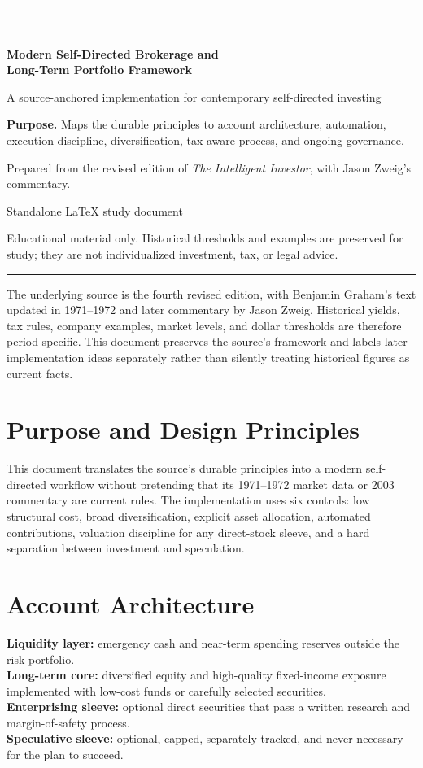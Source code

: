 \documentclass[11pt]{article}
\newcommand{\makedoccover}[4]{%
\hypersetup{pageanchor=false}%
\begin{titlepage}
\thispagestyle{empty}
\vspace*{1.0in}
{\color{Navy}\rule{\linewidth}{2.2pt}}\\[0.55in]
{\Huge\bfseries\color{Navy} #1\par}
\vspace{0.18in}
{\Large\color{Teal} #2\par}
\vspace{0.5in}
\begin{tcolorbox}[colback=LightGray,colframe=Gray,boxrule=0.5pt,arc=2mm]
\textbf{Purpose.} #3
\end{tcolorbox}
\vfill
{\large Prepared from the revised edition of \textit{The Intelligent Investor}, with Jason Zweig's commentary.\par}
\vspace{0.12in}
{\small #4\par}
\vspace{0.25in}
{\small\color{Gray}\parbox{0.90\textwidth}{\centering Educational material only. Historical thresholds and examples are preserved for study; they are not individualized investment, tax, or legal advice.}}\par
\vspace{0.35in}
{\color{Navy}\rule{\linewidth}{2.2pt}}
\end{titlepage}\hypersetup{pageanchor=true}
}
\begin{document}
\makedoccover{Modern Self-Directed Brokerage and\\Long-Term Portfolio Framework}{A source-anchored implementation for contemporary self-directed investing}{Maps the durable principles to account architecture, automation, execution discipline, diversification, tax-aware process, and ongoing governance.}{Standalone LaTeX study document}
\tableofcontents\newpage

\begin{cautionbox}
The underlying source is the fourth revised edition, with Benjamin Graham's text updated in 1971--1972 and later commentary by Jason Zweig. Historical yields, tax rules, company examples, market levels, and dollar thresholds are therefore period-specific. This document preserves the source's framework and labels later implementation ideas separately rather than silently treating historical figures as current facts.
\end{cautionbox}

\section{Purpose and Design Principles}
This document translates the source's durable principles into a modern self-directed workflow without pretending that its 1971--1972 market data or 2003 commentary are current rules. The implementation uses six controls: low structural cost, broad diversification, explicit asset allocation, automated contributions, valuation discipline for any direct-stock sleeve, and a hard separation between investment and speculation.

\section{Account Architecture}
\begin{modernbox}
\textbf{Liquidity layer:} emergency cash and near-term spending reserves outside the risk portfolio.\\
\textbf{Long-term core:} diversified equity and high-quality fixed-income exposure implemented with low-cost funds or carefully selected securities.\\
\textbf{Enterprising sleeve:} optional direct securities that pass a written research and margin-of-safety process.\\
\textbf{Speculative sleeve:} optional, capped, separately tracked, and never necessary for the plan to succeed.
\end{modernbox}
\end{document}
